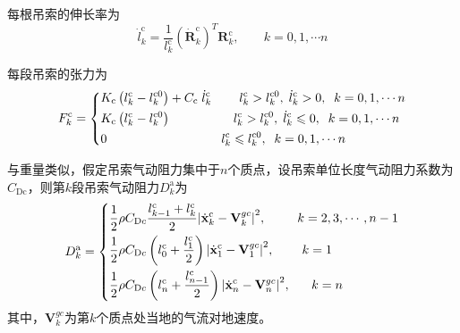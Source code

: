 每根吊索的伸长率为
\begin{equation}
  \dot l_k^{\text{c}} = \frac{1}{{l_k^{\text{c}}}}{\left( {\dot {\mathbf{R}}_k^{\text{c}}} \right)^T}{\mathbf{R}}_k^{\text{c}},\;\;\;\;\;\;\;k = 0,1, \cdots n
\end{equation}

每段吊索的张力为
\begin{equation}
  F_k^{\text{c}} = \left\{ \begin{gathered}
    {K_{\text{c}}}\left( {l_k^{\text{c}} - l_k^{{\text{c}}0}} \right) + {C_{\text{c}}}\;\dot l_k^{\text{c}}\;\;\;\;\;\;\;\;l_k^{\text{c}} > l_k^{{\text{c}}0},\;\dot l_k^{\text{c}} > 0,\;\;k = 0,1, \cdots n \hfill \\
    {K_{\text{c}}}\left( {l_k^{\text{c}} - l_k^{{\text{c}}0}} \right)\;\;\;\;\;\;\;\;\;\;\;\;\;\;\;\;\;\;l_k^{\text{c}} > l_k^{{\text{c}}0},\;\dot l_k^{\text{c}} \leqslant 0,\;\;k = 0,1, \cdots n \hfill \\
    0\;\;\;\;\;\;\;\;\;\;\;\;\;\;\;\;\;\;\;\;\;\;\;\;\;\;\;\;\;\;\;\;\;l_k^{\text{c}} \leqslant l_k^{{\text{c}}0},\;\;k = 0,1, \cdots n \hfill \\ 
  \end{gathered}  \right.
\end{equation}

与重量类似，假定吊索气动阻力集中于$n$个质点，设吊索单位长度气动阻力系数为$C_{\text{Dc}}$，则第$k$段吊索气动阻力$D_{k}^\text{a}$为
\begin{equation}
  D_k^{\text{a}} = \left\{ \begin{gathered}
    \frac{1}{2}\rho {C_{{\text{D}}c}}\frac{{l_{k - 1}^{\text{c}} + l_k^{\text{c}}}}{2}{\left| {\dot{\mathbf{x}}_k^{\text{c}} - {\mathbf{V}}_k^{gc}} \right|^2},\;\;\;\;\;\;\;\;\;k = 2,3, \cdots ,n - 1 \hfill \\
    \frac{1}{2}\rho {C_{{\text{D}}c}}\left( {l_0^{\text{c}} + \frac{{l_1^{\text{c}}}}{2}} \right){\left| {\dot{\mathbf{x}}_1^{\text{c}} - {\mathbf{V}}_1^{gc}} \right|^2},\;\;\;\;\;\;\;\;k = 1 \hfill \\
    \frac{1}{2}\rho {C_{{\text{D}}c}}\left( {l_n^{\text{c}} + \frac{{l_{n - 1}^{\text{c}}}}{2}} \right){\left| {\dot {\mathbf{x}}_n^{\text{c}} - {\mathbf{V}}_n^{gc}} \right|^2},\;\;\;\;\;\;k = n \hfill \\ 
  \end{gathered}  \right.
\end{equation}
其中，$\mathbf{V}_k^{gc}$为第$k$个质点处当地的气流对地速度。

